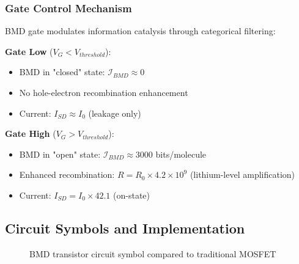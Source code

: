 \documentclass[11pt,a4paper]{article}
\begin{document}
\subsubsection{Gate Control Mechanism}

BMD gate modulates information catalysis through categorical filtering:

\textbf{Gate Low} ($V_G < V_{threshold}$):
\begin{itemize}
\item BMD in "closed" state: $\mathcal{I}_{BMD} \approx 0$
\item No hole-electron recombination enhancement
\item Current: $I_{SD} \approx I_0$ (leakage only)
\end{itemize}

\textbf{Gate High} ($V_G > V_{threshold}$):
\begin{itemize}
\item BMD in "open" state: $\mathcal{I}_{BMD} \approx 3000$ bits/molecule
\item Enhanced recombination: $R = R_0 \times 4.2\times10^9$ (lithium-level amplification)
\item Current: $I_{SD} = I_0 \times 42.1$ (on-state)
\end{itemize}

\subsection{Circuit Symbols and Implementation}

\begin{figure}[H]
\centering
{}
\caption{BMD transistor circuit symbol compared to traditional MOSFET}
\end{figure}
\end{document}
